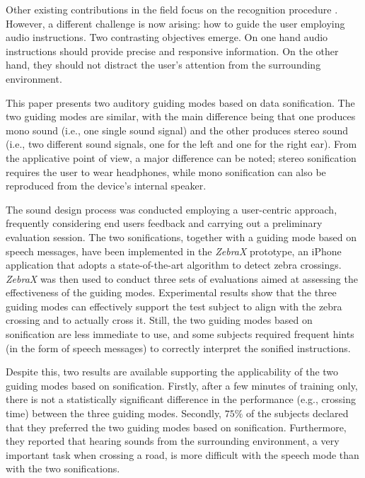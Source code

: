\documentclass{article}
\newcommand{\zebra}{\emph{ZebraX}}
\begin{document}
Other existing contributions in the field focus on the recognition procedure \cite{se,uddin1,uddin2,ivanchenko,ivanchenko2,dragan}. However, a different challenge is now arising: how to guide the user employing audio instructions.
Two contrasting objectives emerge. On one hand audio instructions should provide precise and responsive information. On the other hand, they should not distract the user's attention from the surrounding environment.

This paper presents two auditory guiding modes based on data sonification.
The two guiding modes are similar, with the main difference being that one produces mono sound (i.e., one single sound signal) and the other produces stereo sound (i.e., two different sound signals, one for the left and one for the right ear).
From the applicative point of view, a major difference can be noted; stereo sonification requires the user to wear headphones, while mono sonification can also be reproduced from the device's internal speaker.

The sound design process was conducted employing a user-centric approach, frequently considering end users feedback and carrying out a preliminary evaluation session. The two sonifications, together with a guiding mode based on speech messages, have been implemented in the \zebra{} prototype, an iPhone application that adopts a state-of-the-art algorithm to detect zebra crossings.
\zebra{} was then used to conduct three sets of evaluations aimed at assessing the effectiveness of the guiding modes.
Experimental results show that the three guiding modes can effectively support the test subject to align with the zebra crossing and to actually cross it.
Still, the two guiding modes based on sonification are less immediate to use, and some subjects required frequent hints (in the form of speech messages) to correctly interpret the sonified instructions.

Despite this, two results are available supporting the applicability of the two guiding modes based on sonification.
Firstly, after a few minutes of training only, there is not a statistically significant difference in the performance (e.g., crossing time) between the three guiding modes.
Secondly, $75\%$  of  the  subjects  declared  that  they preferred  the two guiding modes based on sonification. Furthermore, they reported that hearing sounds from the surrounding environment, a very important task when crossing a road, is more difficult with the speech mode than with the two sonifications.
\end{document}
